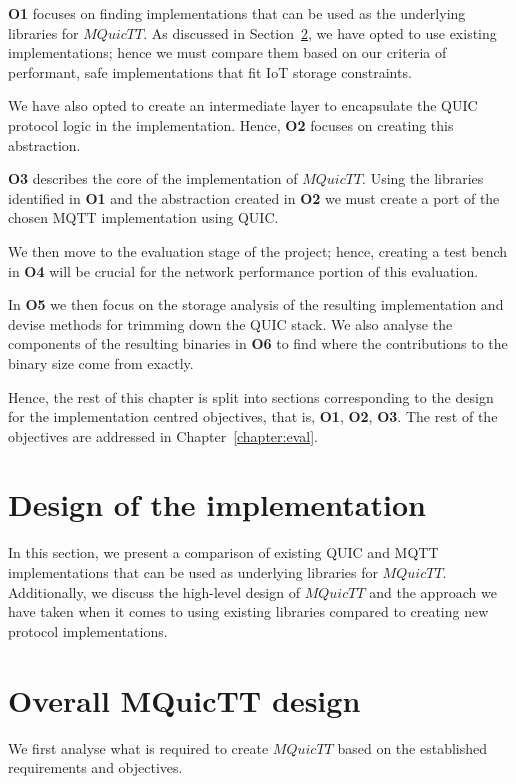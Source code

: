 \textbf{O1} focuses on finding implementations that can be used as the underlying libraries for $MQuicTT$.
As discussed in Section~\ref{sec:mquictt_design}, we have opted to use existing implementations; hence we must compare them based on our criteria of performant, safe implementations that fit IoT storage constraints.

We have also opted to create an intermediate layer to encapsulate the QUIC protocol logic in the implementation.
Hence, \textbf{O2} focuses on creating this abstraction.

\textbf{O3} describes the core of the implementation of $MQuicTT$.
Using the libraries identified in \textbf{O1} and the abstraction created in \textbf{O2} we must create a port of the chosen MQTT implementation using QUIC.

We then move to the evaluation stage of the project; hence, creating a test bench in \textbf{O4} will be crucial for the network performance portion of this evaluation.

In \textbf{O5} we then focus on the storage analysis of the resulting implementation and devise methods for trimming down the QUIC stack.
We also analyse the components of the resulting binaries in \textbf{O6} to find where the contributions to the binary size come from exactly.

Hence, the rest of this chapter is split into sections corresponding to the design for the implementation centred objectives, that is, \textbf{O1}, \textbf{O2}, \textbf{O3}.
The rest of the objectives are addressed in Chapter~\ref{chapter:eval}.

\section{Design of the implementation}

In this section, we present a comparison of existing QUIC and MQTT implementations that can be used as underlying libraries for $MQuicTT$. Additionally, we discuss the high-level design of $MQuicTT$ and the approach we have taken when it comes to using existing libraries compared to creating new protocol implementations.

\section{Overall MQuicTT design} \label{sec:mquictt_design}

We first analyse what is required to create $MQuicTT$ based on the established requirements and objectives.

